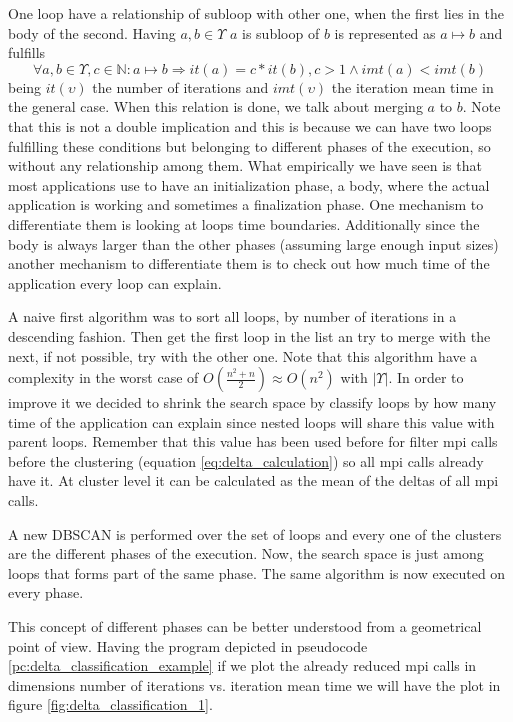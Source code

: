 One loop have a relationship of subloop with other one, when the first lies in
the body of the second. Having $a,b \in \Upsilon$ $a$ is subloop of $b$ is 
represented as $a \mapsto b$ and fulfills 
\begin{equation}
  \label{eq:subloop_rel_imp}
  \forall a,b \in \Upsilon, c \in \mathbb{N} : a \mapsto b \Rightarrow it(a) = c*it(b), c > 1 \land 
imt(a) < imt(b)
\end{equation}
being $it(\upsilon)$ the number of iterations and $imt(\upsilon)$ the iteration
mean time in the general case. When this relation is done, we talk about merging
$a$ to $b$. Note that this is not a double implication and
this is because we can have two loops fulfilling these conditions but belonging
to different phases of the execution, so without any relationship among them. 
What empirically we have seen is that most applications use to have an 
initialization phase, a body, where the actual application is working and 
sometimes a finalization phase. One mechanism to differentiate them is looking
at loops time boundaries. Additionally since the body is always larger than the
other phases (assuming large enough input sizes) another mechanism to 
differentiate them is to check out how much time of the application every loop
can explain. 

A naive first algorithm was to sort all loops, by number of iterations in a
descending fashion. Then get the first loop in the list an try to merge with the
next, if not possible, try with the other one. Note that this algorithm have a
complexity in the worst case of $O(\frac{n^{2}+n}{2}) \approx O(n^{2})$ with
$|\Upsilon|$. In order to improve it we decided to shrink the search space by
classify loops by how many time of the application can explain since nested
loops will share this value with parent loops. Remember that
this value has been used before for filter mpi calls before the clustering (equation
\ref{eq:delta_calculation}) so all mpi calls already have it. At cluster level it
can be calculated as the mean of the deltas of all mpi calls.

A new DBSCAN is performed over the set of loops and every one of the clusters
are the different phases of the execution. Now, the search space is just among 
loops that forms part of the same phase. The same algorithm is now executed 
on every phase.

This concept of different phases can be better understood from a geometrical
point of view. Having the program depicted in pseudocode
\ref{pc:delta_classification_example} if we plot the
already reduced mpi calls in dimensions number of iterations vs. iteration mean
time we will have the plot in figure \ref{fig:delta_classification_1}.


